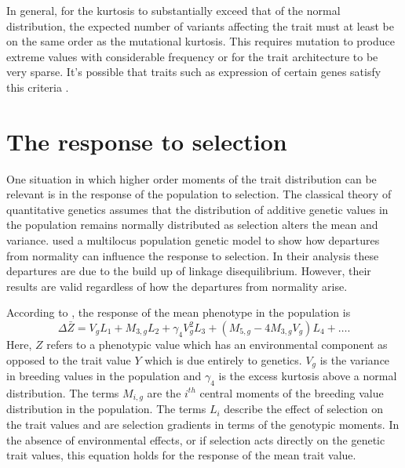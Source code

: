 \documentclass{article}
\begin{document}
In general, for the kurtosis to substantially exceed that of the normal
distribution, the expected number of variants affecting the trait must at least
be on the same order as the mutational kurtosis. This requires mutation to
produce extreme values with considerable frequency or for the trait architecture
to be very sparse. It's possible that traits such as expression of certain genes
satisfy this criteria \citep{Wheeler2016}.
\section{The response to selection}
One situation in which higher order moments of the trait distribution can be
relevant is in the response of the population to selection. The classical theory
of quantitative genetics assumes that the distribution of additive genetic
values in the population remains normally distributed as selection alters the
mean and variance. \citet{Turelli1990} used a multilocus population genetic
model to show how departures from normality can influence the response to
selection. In their analysis these departures are due to the build up of linkage
disequilibrium. However, their results are valid regardless of how the
departures from normality arise.

According to \citet{Turelli1990}, the response of the mean phenotype in the
population is 
\begin{equation}
  \label{eq:selresp}
  \Delta \bar{Z} = V_gL_1 + M_{3,g}L_2 + \gamma_4V^2_gL_3 +
  \left( M_{5,g}-4M_{3,g}V_g\right)L_4 + \ldots.
\end{equation}
Here, $Z$ refers to a phenotypic value which has an environmental component as
opposed to the trait value $Y$ which is due entirely to genetics. $V_g$ is the
variance in breeding values in the population and $\gamma_4$ is the excess
kurtosis above a normal distribution. The terms $M_{i,g}$ are the $i^{th}$
central moments of the breeding value distribution in the population. The terms
$L_i$ describe the effect of selection on the trait values and are selection
gradients in terms of the genotypic moments. In the absence of environmental
effects, or if selection acts directly on the genetic trait values, this
equation holds for the response of the mean trait value.
\end{document}

